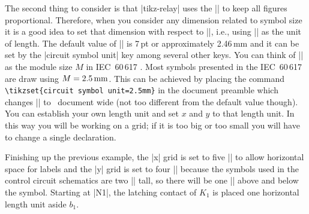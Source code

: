 \documentclass[a4paper]{ltxdoc}
\begin{document}
\begin{codeexample}[width=2.5cm]
\end{codeexample}

The second thing to consider is that |tikz-relay| uses the |\tikzcircuitssizeunit| to keep all figures proportional. Therefore, when you consider any dimension related to symbol size it is a good idea to set that dimension with respect to |\tikzcircuitssizeunit|, i.e., using |\tikzcircuitssizeunit| as the unit of length. The default value of |\tikzcircuitssizeunit| is 7\,pt or approximately 2.46\,mm and it can be set by the |circuit symbol unit| key among several other keys. You can think of |\tikzcircuitssizeunit| as the module size $M$ in IEC~60\,617 \cite{60617-7}. 
Most symbols presented in the IEC~60\,617 are draw using $M=\unit[2.5]{mm}$. This can be achieved by placing the command \verb|\tikzset{circuit symbol unit=2.5mm}| in the document preamble which changes |\tikzcircuitssizeunit| to \the\tikzcircuitssizeunit\ document wide (not too different from the default value though). You can establish your own length unit and set $x$ and $y$ to that length unit. In this way you will be working on a grid; if it is too big or too small you will have to change a single declaration.

Finishing up the previous example, the |x| grid is set to five |\tikzcircuitssizeunit| to allow horizontal space for labels and the |y| grid is set to four |\tikzcircuitssizeunit| because the symbols used in the control circuit schematics are two |\tikzcircuitssizeunit| tall, so there will be one |\tikzcircuitssizeunit| above and below the symbol. Starting at |N1|, the latching contact of $K_1$ is placed one horizontal length unit aside $b_1$.
\end{document}
